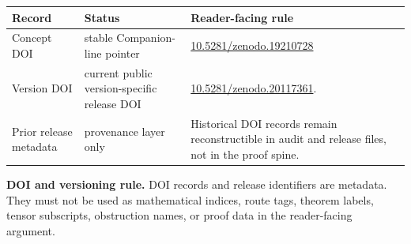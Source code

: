 \begin{center}
\small
\begin{tabular}{>{\raggedright\arraybackslash}p{} >{\raggedright\arraybackslash}p{} >{\raggedright\arraybackslash}p{}}
\toprule
\textbf{Record} & \textbf{Status} & \textbf{Reader-facing rule}\\
\midrule
Concept DOI & stable Companion-line pointer & \href{https://doi.org/10.5281/zenodo.19210728}{10.5281/zenodo.19210728}\\
Version DOI & current public version-specific release DOI & \href{https://doi.org/10.5281/zenodo.20117361}{10.5281/zenodo.20117361}.\\
Prior release metadata & provenance layer only & Historical DOI records remain reconstructible in audit and release files, not in the proof spine.\\
\bottomrule
\end{tabular}
\end{center}

\noindent\textbf{DOI and versioning rule.} DOI records and release identifiers are metadata. They must not be used as mathematical indices, route tags, theorem labels, tensor subscripts, obstruction names, or proof data in the reader-facing argument.

\clearpage

